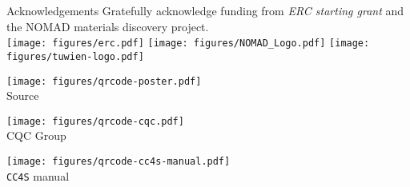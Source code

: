 \begin{block}{\large Acknowledgements}
  Gratefully acknowledge funding from \textit{ERC starting grant}
  and the
  NOMAD
  materials discovery project. \\
  \vspace*{1cm}
  \texttt{[image: figures/erc.pdf]}
  \hfill
  \texttt{[image: figures/NOMAD\_Logo.pdf]}
  \hfill
  \texttt{[image: figures/tuwien-logo.pdf]} \\
  \vspace*{1cm}
  \begin{minipage}{4em}
    \centering
    \texttt{[image: figures/qrcode-poster.pdf]}\\
    {\tiny Source}
  \end{minipage}
  \hfill
  \begin{minipage}{4em}
    \centering
    \texttt{[image: figures/qrcode-cqc.pdf]}\\
    {\tiny CQC Group}
  \end{minipage}
  \hfill
  \begin{minipage}{4em}
    \centering
    \texttt{[image: figures/qrcode-cc4s-manual.pdf]}\\
    {\tiny \texttt{CC4S} manual}
  \end{minipage}
\end{block}
